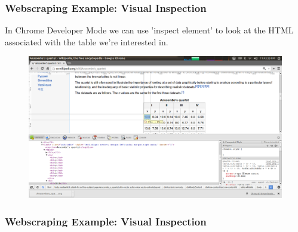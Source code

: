 \documentclass{beamer}
\begin{document}
\begin{frame}
\frametitle{Webscraping Example: Visual Inspection}
In Chrome Developer Mode we can use 'inspect element' to look at the HTML associated with the table we're interested in.

\begin{figure}[h]
\centering
\includegraphics[width=.9\textwidth]{images/chrome_devel.png}
\end{figure}
\end{frame}


\begin{frame}
\frametitle{Webscraping Example: Visual Inspection}
 
\end{frame}
\end{document}
